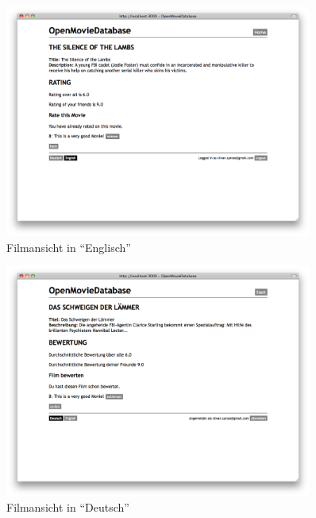 \begin{figure}[ht]
    \begin{center}
        \includegraphics[width=0.9\textwidth,angle=0]{./bilder/tests/test_internationalisierung_01.png}
        \caption{Filmansicht in ``Englisch''}
        \label{test_internationalisierung_01}
    \end{center}
\end{figure}

\begin{figure}[ht]
    \begin{center}
        \includegraphics[width=0.9\textwidth,angle=0]{./bilder/tests/test_internationalisierung_02.png}
        \caption{Filmansicht in ``Deutsch''}
        \label{test_internationalisierung_02}
    \end{center}
\end{figure}

